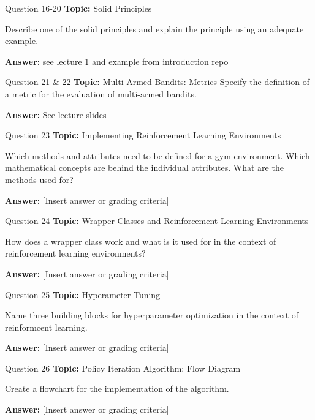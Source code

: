 \begin{frame}{Question 16-20}
    \textbf{Topic:} Solid Principles

    Describe one of the solid principles and explain the principle using an adequate example. 
    \vspace{20pt}

    \textbf{Answer:} see lecture 1 and example from introduction repo
\end{frame}

\begin{frame}{Question 21 \& 22}
    \textbf{Topic:} Multi-Armed Bandits: Metrics
    \vspace{10pt}
    Specify the definition of a metric for the evaluation of multi-armed bandits.
    \vspace{20pt}

    \textbf{Answer:} See lecture slides
\end{frame}

\begin{frame}{Question 23}
    \textbf{Topic:} Implementing Reinforcement Learning Environments
    
    \vspace{10pt}
    Which methods and attributes need to be defined for a gym environment. Which mathematical concepts are behind the individual attributes. What are the methods used for? 
    \vspace{20pt}

    \textbf{Answer:} [Insert answer or grading criteria]
\end{frame}

\begin{frame}{Question 24}
    \textbf{Topic:} Wrapper Classes and Reinforcement Learning Environments

    \vspace{10pt}
    How does a wrapper class work and what is it used for in the context of reinforcement learning environments?   
    \vspace{20pt}

    \textbf{Answer:} [Insert answer or grading criteria]
\end{frame}

\begin{frame}{Question 25}
    \textbf{Topic:} Hyperameter Tuning

    \vspace{10pt}
    Name three building blocks for hyperparameter optimization in the context of reinformcent learning.  
    \vspace{20pt}

    \textbf{Answer:} [Insert answer or grading criteria]
\end{frame}
\begin{frame}{Question 26}
    \textbf{Topic:} Policy Iteration Algorithm: Flow Diagram

    \vspace{10pt}
    Create a flowchart for the implementation of the algorithm. 
    \vspace{20pt}

    \textbf{Answer:} [Insert answer or grading criteria]
\end{frame}


